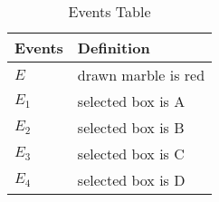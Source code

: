 \solution
\begin{table}[htbp]
\begin{tabular}{|l|l|}\hline
Events	&Definition			\\\hline
$E$	&drawn marble is red			\\
$E_1$	&selected box is A			\\
$E_2$	&selected box is B			\\
$E_3$	&selected box is C			\\
$E_4$	&selected box is D			\\\hline
\end{tabular}\\
\caption{Events Table}
\label{Table 1:}
\end{table}
